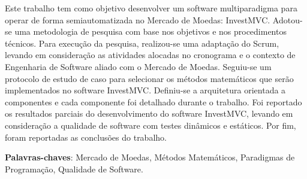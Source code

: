 \begin{resumo}

Este trabalho tem como objetivo desenvolver um software multiparadigma para operar
de forma semiautomatizada no Mercado de Moedas: InvestMVC. Adotou-se uma metodologia de pesquisa com base nos objetivos e nos procedimentos técnicos. Para execução da pesquisa, realizou-se uma adaptação do Scrum, levando em consideração as atividades
alocadas no cronograma e o contexto de Engenharia de Software aliado com o Mercado de
Moedas. Seguiu-se um protocolo de estudo de caso para selecionar os métodos matemáticos que serão implementados no software InvestMVC. Definiu-se a arquitetura orientada a componentes e cada componente foi detalhado durante o trabalho. Foi reportado os resultados parciais do desenvolvimento do software InvestMVC, levando em consideração a qualidade de software com testes dinâmicos e estáticos. Por fim, foram reportadas as conclusões do trabalho.

\vspace{\onelineskip}
    
 \noindent
 \textbf{Palavras-chaves}: Mercado de Moedas, Métodos Matemáticos, Paradigmas de Programação, Qualidade de Software.
\end{resumo}
